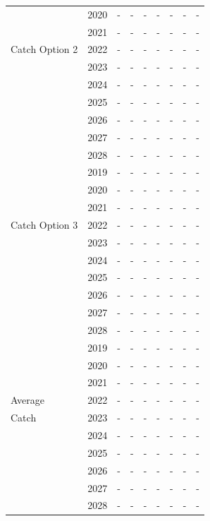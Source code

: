 \documentclass[12pt,]{article}
\begin{document}
\begin{table}[ht]
{\begin{tabular}{l|cc|>{\centering}p{.7in}c|>{\centering}p{.7in}c|>{\centering}p{.7in}c}
   & 2020 & - & - & - & - & - & - & - \\ 
   & 2021 & - & - & - & - & - & - & - \\ 
  Catch Option 2 & 2022 & - & - & - & - & - & - & - \\ 
   & 2023 & - & - & - & - & - & - & - \\ 
   & 2024 & - & - & - & - & - & - & - \\ 
   & 2025 & - & - & - & - & - & - & - \\ 
   & 2026 & - & - & - & - & - & - & - \\ 
   & 2027 & - & - & - & - & - & - & - \\ 
   & 2028 & - & - & - & - & - & - & - \\ 
   \hline
 & 2019 & - & - & - & - & - & - & - \\ 
   & 2020 & - & - & - & - & - & - & - \\ 
   & 2021 & - & - & - & - & - & - & - \\ 
  Catch Option 3 & 2022 & - & - & - & - & - & - & - \\ 
   & 2023 & - & - & - & - & - & - & - \\ 
   & 2024 & - & - & - & - & - & - & - \\ 
   & 2025 & - & - & - & - & - & - & - \\ 
   & 2026 & - & - & - & - & - & - & - \\ 
   & 2027 & - & - & - & - & - & - & - \\ 
   & 2028 & - & - & - & - & - & - & - \\ 
   \hline
 & 2019 & - & - & - & - & - & - & - \\ 
   & 2020 & - & - & - & - & - & - & - \\ 
   & 2021 & - & - & - & - & - & - & - \\ 
  Average & 2022 & - & - & - & - & - & - & - \\ 
  Catch & 2023 & - & - & - & - & - & - & - \\ 
   & 2024 & - & - & - & - & - & - & - \\ 
   & 2025 & - & - & - & - & - & - & - \\ 
   & 2026 & - & - & - & - & - & - & - \\ 
   & 2027 & - & - & - & - & - & - & - \\ 
   & 2028 & - & - & - & - & - & - & - \\ 
   \hline
\end{tabular}
}
\end{table}

\FloatBarrier
\end{document}
